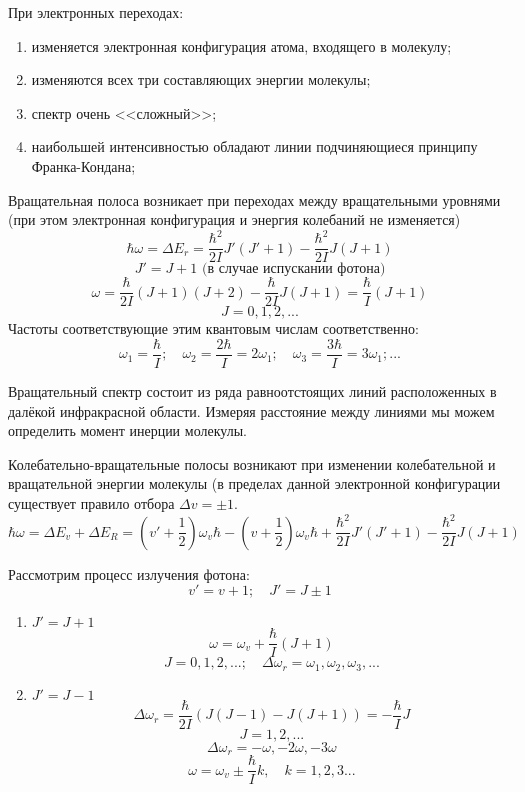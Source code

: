 При электронных переходах:
\begin{enumerate}
    \item изменяется электронная конфигурация атома, 
    входящего в молекулу; 
    \item изменяются всех три составляющих энергии молекулы; 
    \item спектр очень <<сложный>>;
    \item наибольшей интенсивностью обладают линии подчиняющиеся принципу 
    Франка-Кондана;
\end{enumerate}

Вращательная полоса возникает при переходах между вращательными уровнями 
(при этом электронная конфигурация и энергия колебаний не изменяется)
\[ 
    \hbar\omega = \Delta E_r = \frac{\hbar^2}{2I} J'(J'+1) - 
    \frac{\hbar^2}{2I} J(J+1)
\]
\[ J' = J + 1 \text{ (в случае испускании фотона)} \]
\[ 
    \omega = \frac{\hbar}{2I}(J+1)(J+2) - \frac{\hbar}{2I}J(J+1) = 
    \frac{\hbar}{I}(J+1)
\]
\[ 
    J = 0, 1, 2, ...
\]
Частоты соответствующие этим квантовым числам соответственно:
\[ 
    \omega_1 = \frac{\hbar}{I}; \quad
    \omega_2 = \frac{2\hbar}{I} = 2\omega_1; \quad
    \omega_3 = \frac{3\hbar}{I} = 3\omega_1; ...
\]

Вращательный спектр состоит из ряда равноотстоящих линий расположенных в 
далёкой инфракрасной области. Измеряя расстояние между линиями мы можем 
определить момент инерции молекулы.

Колебательно-вращательные полосы возникают при изменении колебательной и 
вращательной энергии молекулы (в пределах данной электронной конфигурации 
существует правило отбора \( \Delta v = \pm 1 \).
\[ 
    \hbar\omega = \Delta E_v + \Delta E_R = 
    \left(v' + \frac{1}{2}\right)\omega_v\hbar - 
    \left(v + \frac{1}{2}\right)\omega_v\hbar + 
    \frac{\hbar^2}{2I}J'(J'+1) - \frac{\hbar^2}{2I}J(J+1)
\]

Рассмотрим процесс излучения фотона:
\[ 
    v' = v + 1; \quad
    J' = J \pm 1
\]
\begin{enumerate}
    \item \( J' = J + 1 \)
        \[ \omega = \omega_v + \frac{\hbar}{I}(J+1) \]
        \[ 
            J = 0, 1, 2, ...; \quad
            \Delta\omega_r = \omega_1, \omega_2, \omega_3, ...
        \]
    \item \( J' = J - 1 \)
        \[ 
            \Delta\omega_r = \frac{\hbar}{2I}
            \left(J(J-1) - J(J+1)\right) = -\frac{\hbar}{I}J
        \]
        \[ J = 1, 2, ... \]
        \[ \Delta\omega_r = -\omega, -2\omega, -3\omega \]
        \[ \omega = \omega_v \pm \frac{\hbar}{I}k,\quad k = 1, 2, 3 ... \]
\end{enumerate}

